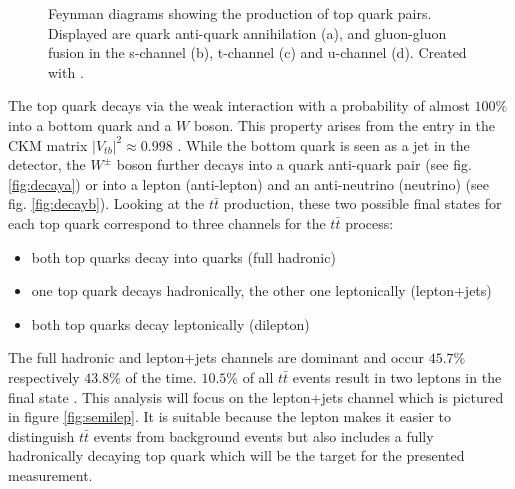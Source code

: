 \begin{figure}
\begin{subfigure}{.4\textwidth}
		\caption{}
		\label{fig:productionc}
		\end{subfigure}
		\begin{subfigure}{.4\textwidth}
		\caption{}
		\label{fig:productiond}
		\end{subfigure}
		\caption{Feynman diagrams showing the production of top quark pairs. Displayed are quark anti-quark annihilation (a), and gluon-gluon fusion in the s-channel (b), t-channel  (c) and u-channel (d). Created with \cite{feynman}.}
	\end{figure}	
	The top quark decays via the weak interaction with a probability of almost $100\%$ into a bottom quark and a $W$ boson. This property arises from the entry in the CKM matrix $|V_{tb}|^2 \approx 0.998$ \cite{pdg2016}. While the bottom quark is seen as a jet in the detector, the $W^\pm$ boson further decays into a quark anti-quark pair (see fig. \ref{fig:decaya}) or into a lepton (anti-lepton) and an anti-neutrino (neutrino) (see fig. \ref{fig:decayb}). Looking at the $t\bar{t}$ production, these two possible final states for each top quark correspond to three channels for the $t\bar{t}$ process: 
	\begin{itemize}
	\item both top quarks decay into quarks (full hadronic)
	\item one top quark decays hadronically, the other one leptonically (lepton+jets)
	\item both top quarks decay leptonically (dilepton)
	\end{itemize}
	The full hadronic and lepton+jets channels are dominant and occur $45.7\%$ respectively $43.8\%$ of the time. $10.5\%$ of all $t\bar{t}$ events result in two leptons in the final state \cite{pdg2016}. This analysis will focus on the lepton+jets channel which is pictured in figure \ref{fig:semilep}. It is suitable because the lepton makes it easier to distinguish $t\bar{t}$ events from background events but also includes a fully hadronically decaying top quark which will be the target for the presented measurement.
	
